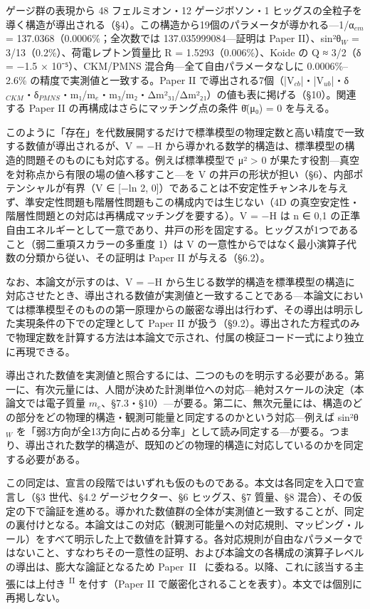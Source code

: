 \documentclass[fontsize=11pt,paper=a4,lualatex]{jlreq}
\newcommand{\PII}{\textsuperscript{\textup{II}}}
\begin{document}
ゲージ群の表現から 48 フェルミオン・12 ゲージボソン・1 ヒッグスの全粒子を導く構造が導出される（§4）。この構造から19個のパラメータが導かれる---1/α$_{em}$ = 137.0368（0.0006\%；全次数では 137.035999084---証明は Paper II）、sin²θ$_W$ = 3/13（0.2\%）、荷電レプトン質量比 R = 1.5293（0.006\%）、Koide の Q ≈ 3/2（δ = −1.5 × 10⁻⁵）、CKM/PMNS 混合角---全て自由パラメータなしに 0.0006\%–2.6\% の精度で実測値と一致する。Paper II で導出される7個（|V$_{cb}$|・|V$_{ub}$|・δ$_{CKM}$・δ$_{PMNS}$・m₁/m$_e$・m₃/m₂・Δm²₃₁/Δm²₂₁）の値も表に掲げる（§10）。関連する Paper II の再構成はさらにマッチング点の条件 θ̄(μ₀) = 0 を与える。

このように「存在」を代数展開するだけで標準模型の物理定数と高い精度で一致する数値が導出されるが、V = −H から導かれる数学的構造は、標準模型の構造的問題そのものにも対応する。例えば標準模型で μ² > 0 が果たす役割---真空を対称点から有限の場の値へ移すこと---を V の井戸の形状が担い（§6）、内部ポテンシャルが有界（V ∈ [−ln 2, 0]）であることは不安定性チャンネルを与えず、準安定性問題も階層性問題もこの構成内では生じない（4D の真空安定性・階層性問題との対応は再構成マッチングを要する）。V = −H は n ∈ {0,1} の正準自由エネルギーとして一意であり、井戸の形を固定する。ヒッグスが1つであること（弱二重項スカラーの多重度 1）は V の一意性からではなく最小演算子代数の分類から従い、その証明は Paper II が与える（§6.2）。

なお、本論文が示すのは、V = −H から生じる数学的構造を標準模型の構造に対応させたとき、導出される数値が実測値と一致することである---本論文においては標準模型そのものの第一原理からの厳密な導出は行わず、その導出は明示した実現条件の下での定理として Paper II が扱う（§9.2）。導出された方程式のみで物理定数を計算する方法は本論文で示され、付属の検証コード一式により独立に再現できる。

導出された数値を実測値と照合するには、二つのものを明示する必要がある。第一に、有次元量には、人間が決めた計測単位への対応---絶対スケールの決定（本論文では電子質量 $m_e$、\S7.3・\S10）---が要る。第二に、無次元量には、構造のどの部分をどの物理的構造・観測可能量と同定するのかという対応---例えば sin²θ$_W$ を「弱3方向が全13方向に占める分率」として読み同定する---が要る。つまり、導出された数学的構造が、既知のどの物理的構造に対応しているのかを同定する必要がある。

この同定は、宣言の段階ではいずれも仮のものである。本文は各同定を入口で宣言し（§3 世代、§4.2 ゲージセクター、§6 ヒッグス、§7 質量、§8 混合）、その仮定の下で論証を進める。導かれた数値群の全体が実測値と一致することが、同定の裏付けとなる。本論文はこの対応（観測可能量への対応規則、マッピング・ルール）をすべて明示した上で数値を計算する。各対応規則が自由なパラメータではないこと、すなわちその一意性の証明、および本論文の各構成の演算子レベルの導出は、膨大な論証となるため Paper~II~\cite{paper2} に委ねる。以降、これに該当する主張には上付き \PII{} を付す（Paper II で厳密化されることを表す）。本文では個別に再掲しない。
\end{document}
